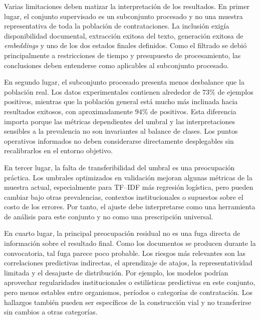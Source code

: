 Varias limitaciones deben matizar la interpretación de los resultados. En primer lugar, el conjunto supervisado es un subconjunto procesado y no una muestra representativa de toda la población de contrataciones. La inclusión exigía disponibilidad documental, extracción exitosa del texto, generación exitosa de \textit{embeddings} y uno de los dos estados finales definidos. Como el filtrado se debió principalmente a restricciones de tiempo y presupuesto de procesamiento, las conclusiones deben entenderse como aplicables al subconjunto procesado.

En segundo lugar, el subconjunto procesado presenta menos desbalance que la población real. Los datos experimentales contienen alrededor de $73\%$ de ejemplos positivos, mientras que la población general está mucho más inclinada hacia resultados exitosos, con aproximadamente $94\%$ de positivos. Esta diferencia importa porque las métricas dependientes del umbral y las interpretaciones sensibles a la prevalencia no son invariantes al balance de clases. Los puntos operativos informados no deben considerarse directamente desplegables sin recalibrarlos en el entorno objetivo.

En tercer lugar, la falta de transferibilidad del umbral es una preocupación práctica. Los umbrales optimizados en validación mejoran algunas métricas de la muestra actual, especialmente para TF--IDF más regresión logística, pero pueden cambiar bajo otras prevalencias, contextos institucionales o supuestos sobre el costo de los errores. Por tanto, el ajuste debe interpretarse como una herramienta de análisis para este conjunto y no como una prescripción universal.

En cuarto lugar, la principal preocupación residual no es una fuga directa de información sobre el resultado final. Como los documentos se producen durante la convocatoria, tal fuga parece poco probable. Los riesgos más relevantes son las correlaciones predictivas indirectas, el aprendizaje de atajos, la representatividad limitada y el desajuste de distribución. Por ejemplo, los modelos podrían aprovechar regularidades institucionales o estilísticas predictivas en este conjunto, pero menos estables entre organismos, períodos o categorías de contratación. Los hallazgos también pueden ser específicos de la construcción vial y no transferirse sin cambios a otras categorías.
